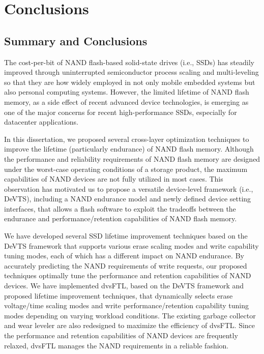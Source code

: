 
\chapter{Conclusions}
\label{chap:Conclusions}

\section{Summary and Conclusions}


The cost-per-bit of NAND flash-based solid-state drives (i.e., SSDs) has steadily improved through uninterrupted semiconductor process scaling and multi-leveling so that they are how widely employed in not only mobile embedded systems but also personal computing systems.
However, the limited lifetime of NAND flash memory, as a side effect of recent advanced device technologies, is emerging as one of the major concerns for recent high-performance SSDs, especially for datacenter applications.


In this dissertation, we proposed several cross-layer optimization techniques to improve the lifetime (particularly endurance) of NAND flash memory.
Although the performance and reliability requirements of NAND flash memory are designed under the worst-case operating conditions of a storage product, the maximum capabilities of NAND devices are not fully utilized in most cases.
This observation has motivated us to propose a versatile device-level framework (i.e., DeVTS), including a NAND endurance model and newly defined device setting interfaces, that allows a flash software to exploit the tradeoffs between the endurance and performance/retention capabilities of NAND flash memory.


We have developed several SSD lifetime improvement techniques based on the DeVTS framework that supports various erase scaling modes and write capability tuning modes, each of which has a different impact on NAND endurance.
By accurately predicting the NAND requirements of write requests, our proposed techniques optimally tune the performance and retention capabilities of NAND devices.
We have implemented dvsFTL, based on the DeVTS framework and proposed lifetime improvement techniques, that dynamically selects erase voltage/time scaling modes and write performance/retention capability tuning modes depending on varying workload conditions.
The existing garbage collector and wear leveler are also redesigned to maximize the efficiency of dvsFTL.
Since the performance and retention capabilities of NAND devices are frequently relaxed, dvsFTL manages the NAND requirements in a reliable fashion.


